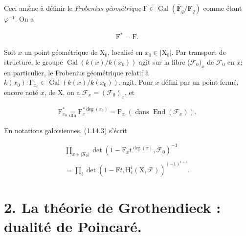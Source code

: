 \documentclass[10pt,leqno]{article}
\begin{document}
\noindent Ceci amène à définir le \emph{Frobenius géométrique} \(\mathrm{F}\in \operatorname{Gal}(\overline{\mathbf{F}}_{q}/\mathbf{F}_{q})\) comme étant \(\varphi ^{- 1}\). On a\par

\begin{equation*}\begin{gathered}\mathrm{F}^{*} = \mathrm{F}.\end{gathered}\tag{1.15.1}\end{equation*}

\noindent Soit \(x\) un point géométrique de \(\mathrm{X}_{0}\), localisé en \(x_{0}\in |\mathrm{X}_{0}|\). Par transport de structure, le groupe \(\operatorname{Gal}(k(x)/k(x_{0}))\) agit sur la fibre (\(\mathcal{F} _{0})_{x}\) de \(\mathcal{F} _{0}\) en \(x\); en particulier, le Frobenius géométrique relatif à \(k(x_{0}) : \mathrm{F}_{x_{0}}\in \operatorname{Gal}(k(x)/k(x_{0}))\), agit. Pour \(x\) défini par un point fermé, encore noté \(x\), de \(\mathrm{X}\), on a \(\mathcal{F} _{x}=(\mathcal{F} _{0})_{x}\), et\par

\begin{equation*}\begin{gathered}\mathrm{F}_{x_{0}}^{*} \underset{\mathrm{dfn}}{=} \mathrm{F}_{x}^{*\operatorname{deg}(x_{0})} = \mathrm{F}_{x_{0}}    (\text{ dans }\operatorname{End}(\mathcal{F} _{x})).\end{gathered}\tag{1.15.2}\end{equation*}

\noindent En notations galoisiennes, (1.14.3) s’écrit\par

\begin{equation*}\begin{gathered}\prod _{x\in |\mathrm{X}_{0}|} \operatorname{det}(1- \mathrm{F}_{x} t^{\operatorname{deg}(x)},\mathcal{F} _{0})^{- 1} \\ = \prod _{i} \operatorname{det}(1- \mathrm{F}t,\mathrm{H}_{c}^{i}(\mathrm{X},\mathcal{F} ))^{(- 1)^{i+1}}.\end{gathered}\end{equation*}

\clearpage

\label{physical-9}

\section*{2. La théorie de Grothendieck : dualité de Poincaré.}
\end{document}
